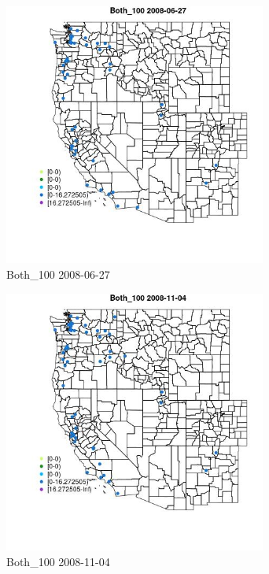 \begin{figure} 
\centering  
\includegraphics[width=0.77\textwidth]{Code_Outputs/Report_ML_input_PM25_Step4_part_e_de_duplicated_aves_MapObsBoth_1002008-06-27.jpg} 
\caption{\label{fig:Report_ML_input_PM25_Step4_part_e_de_duplicated_avesMapObsBoth_1002008-06-27}Both_100 2008-06-27} 
\end{figure} 
 

\begin{figure} 
\centering  
\includegraphics[width=0.77\textwidth]{Code_Outputs/Report_ML_input_PM25_Step4_part_e_de_duplicated_aves_MapObsBoth_1002008-11-04.jpg} 
\caption{\label{fig:Report_ML_input_PM25_Step4_part_e_de_duplicated_avesMapObsBoth_1002008-11-04}Both_100 2008-11-04} 
\end{figure} 
 

